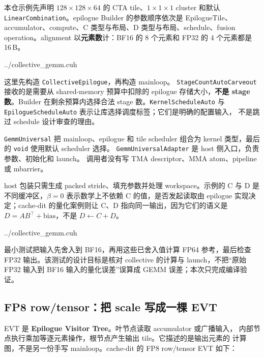 本仓示例先声明
$128\times128\times64$ 的 CTA tile、$1\times1\times1$ cluster 和默认
\texttt{LinearCombination}。epilogue Builder 的参数顺序依次是 EpilogueTile、
accumulator、compute、C 类型与布局、D 类型与布局、schedule、fusion operation。alignment
以\textbf{元素数}计：BF16 的 8 个元素和 FP32 的 4 个元素都是 16\,B。

\begin{lstinputlisting}[linerange={31-53},firstnumber=auto,
  title={collective\_gemm.cuh L31--53（BF16 的两个 Builder）}]{../collective_gemm.cuh}
\end{lstinputlisting}

这里先构造 \texttt{CollectiveEpilogue}，再构造 mainloop。
\texttt{StageCountAuto}\allowbreak\texttt{Carveout} 接收的是需要从 shared-memory 预算中扣除的
epilogue 存储大小，\textbf{不是 stage 数}。Builder 在剩余预算内选择合法
stage 数。\texttt{KernelSchedule}\allowbreak\texttt{Auto} 与
\texttt{EpilogueSchedule}\allowbreak\texttt{Auto} 表示让库选择调度标签；它们是明确的配置输入，
不是跳过 schedule 设计审查的理由。

\texttt{GemmUniversal} 把 mainloop、epilogue 和 tile scheduler 组合为
kernel 类型，最后的 \texttt{void} 使用默认 scheduler 选择。
\texttt{GemmUniversalAdapter} 是 host 侧入口，负责参数、初始化和 launch。
调用者没有写 TMA descriptor、MMA atom、pipeline 或 mbarrier。

host 包装只需生成 packed stride、填充参数并处理 workspace。示例的 C 与 D
是不同缓冲区，$\beta=0$ 表示数学上不依赖 C 的值，是否发起读取由
epilogue 实现决定；cache-dit 的量化案例则让 C、D
指向同一输出，因为它们的语义是 $D=AB^{\top}+\mathrm{bias}$，不是
$D\leftarrow C+D$。

\begin{lstinputlisting}[linerange={65-89},firstnumber=auto,
  title={collective\_gemm.cuh L65--89（packed stride 与 Adapter launch）}]{../collective_gemm.cuh}
\end{lstinputlisting}

最小测试把输入先舍入到 BF16，再用这些已舍入值计算 FP64 参考，最后检查
FP32 输出。该测试的设计目标是核对 collective 的计算与 launch，不把“原始
FP32 输入到 BF16 输入的量化误差”误算成 GEMM 误差；本次只完成编译验证。

\subsection{FP8 row/tensor：把 scale 写成一棵 EVT}

EVT 是 \textbf{Epilogue Visitor Tree}。叶节点读取 accumulator 或广播输入，
内部节点执行乘加等逐元素操作，根节点产生输出 tile。它描述的是输出元素的
计算图，不是另一份手写 mainloop。cache-dit 的 FP8 row/tensor EVT 如下：

